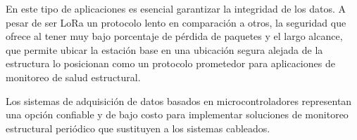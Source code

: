 	En este tipo de aplicaciones es esencial garantizar la integridad de los datos.	A pesar de ser LoRa un protocolo lento en comparación a otros, la seguridad que ofrece al tener muy bajo porcentaje de pérdida de paquetes y el largo alcance, que permite ubicar la estación base en una ubicación segura alejada de la estructura lo posicionan como un protocolo prometedor para aplicaciones de monitoreo de salud estructural. 
	
    Los sistemas de adquisición de datos basados en microcontroladores representan una opción confiable y de bajo costo para implementar soluciones de monitoreo estructural periódico que sustituyen a los sistemas cableados.